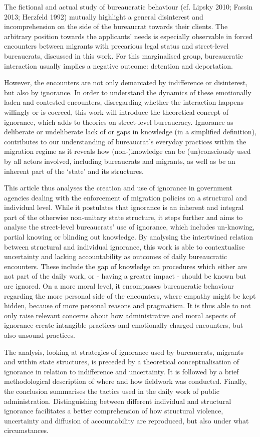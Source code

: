 \par
The fictional and actual study of bureaucratic behaviour (cf. Lipsky 2010; Fassin 2013; Herzfeld 1992) mutually highlight a general disinterest and incomprehension on the side of the bureaucrat towards their clients. The arbitrary position towards the applicants’ needs is especially observable in forced encounters between migrants with precarious legal status and street-level bureaucrats, discussed in this work. For this marginalised group, bureaucratic interaction usually implies a negative outcome: detention and deportation. 
\par
However, the encounters are not only demarcated by indifference or disinterest, but also by ignorance. In order to understand the dynamics of these emotionally laden and contested encounters, disregarding whether the interaction happens willingly or is coerced, this work will introduce the theoretical concept of ignorance, which adds to theories on street-level bureaucracy. Ignorance as deliberate or undeliberate lack of or gaps in knowledge (in a simplified definition), contributes to our understanding of bureaucrat’s everyday practices within the migration regime as it reveals how (non-)knowledge can be (un)consciously used by all actors involved, including bureaucrats and migrants, as well as be an inherent part of the ‘state’ and its structures.
\par
This article thus analyses the creation and use of ignorance in government agencies dealing with the enforcement of migration policies on a structural and individual level. While it postulates that ignorance is an inherent and integral part of the otherwise non-unitary state structure, it steps further and aims to analyse the street-level bureaucrats’ use of ignorance, which includes un-knowing, partial knowing or blinding out knowledge. By analysing the intertwined relation between structural and individual ignorance, this work is able to contextualise uncertainty and lacking accountability as outcomes of daily bureaucratic encounters. These include the gap of knowledge on  procedures which either are not part of the daily work, or - having a greater impact -  should be known but are ignored. On a more moral level, it encompasses bureaucratic behaviour regarding the more personal side of the encounters, where empathy might be kept hidden, because of more personal reasons and pragmatism. It is thus able to not only raise relevant concerns about how administrative and moral aspects of ignorance create intangible practices and emotionally charged encounters, but also unsound practices.
\par
The analysis, looking at strategies of ignorance used by bureaucrats, migrants and within state structures, is preceded by a theoretical conceptualisation of ignorance in relation to indifference and uncertainty. It is followed by a brief methodological description of where and how fieldwork was conducted. Finally, the conclusion summarises the tactics used in the daily work of public administration. Distinguishing between different individual and structural ignorance facilitates a better comprehension of how structural violence, uncertainty and diffusion of accountability are reproduced, but also under what circumstances.

